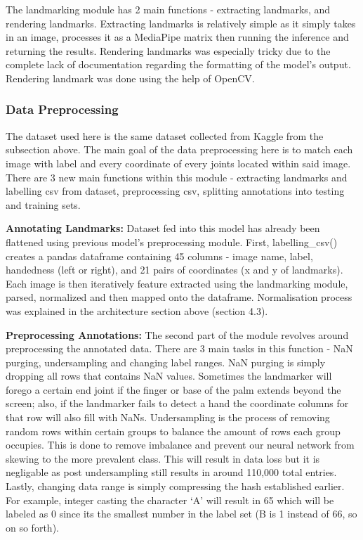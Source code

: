 \documentclass[11pt]{article}
\def\paraskip{\vskip 0.4cm}
\begin{document}
    The landmarking module has 2 main functions - extracting landmarks, and rendering landmarks. Extracting landmarks is relatively simple as it simply takes in an image, processes it as a MediaPipe matrix then running the inference and returning the results. Rendering landmarks was especially tricky due to the complete lack of documentation regarding the formatting of the model's output. Rendering landmark was done using the help of OpenCV.

        \subsubsection{Data Preprocessing}
    The dataset used here is the same dataset collected from Kaggle from the subsection above. The main goal of the data preprocessing here is to match each image with label and every coordinate of every joints located within said image. There are 3 new main functions within this module - extracting landmarks and labelling csv from dataset, preprocessing csv, splitting annotations into testing and training sets. 
    
    \paraskip

    \noindent\textbf{Annotating Landmarks: } Dataset fed into this model has already been flattened using previous model's preprocessing module. First, labelling\_csv() creates a pandas dataframe containing 45 columns - image name, label, handedness (left or right), and 21 pairs of coordinates (x and y of landmarks). Each image is then iteratively feature extracted using the landmarking module, parsed, normalized and then mapped onto the dataframe. Normalisation process was explained in the architecture section above (section 4.3). 
    
    \paraskip

    \noindent\textbf{Preprocessing Annotations: } The second part of the module revolves around preprocessing the annotated data. There are 3 main tasks in this function - NaN purging, undersampling and changing label ranges. NaN purging is simply dropping all rows that contains NaN values. Sometimes the landmarker will forego a certain end joint if the finger or base of the palm extends beyond the screen; also, if the landmarker fails to detect a hand the coordinate columns for that row will also fill with NaNs. Undersampling is the process of removing random rows within certain groups to balance the amount of rows each group occupies. This is done to remove imbalance and prevent our neural network from skewing to the more prevalent class. This will result in data loss but it is negligable as post undersampling still results in around 110,000 total entries. Lastly, changing data range is simply compressing the hash established earlier. For example, integer casting the character `A' will result in 65 which will be labeled as 0 since its the smallest number in the label set (B is 1 instead of 66, so on so forth).
\end{document}
